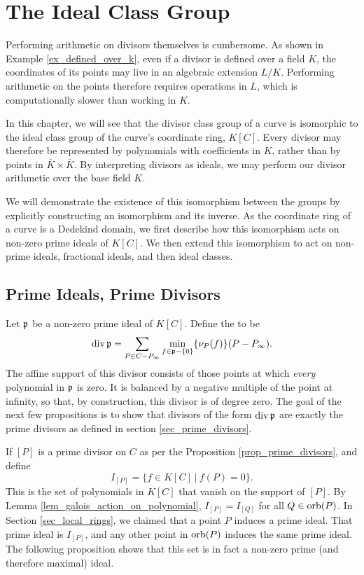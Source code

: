 
\section{The Ideal Class Group}
\label{chap_ideals}

Performing arithmetic on divisors themselves is cumbersome.
As shown in Example \ref{ex_defined_over_k},
even if a divisor is defined over a field $K$,
the coordinates of its points may live in an algebraic extension $L/K$.
Performing arithmetic on the points therefore requires operations in $L$,
which is computationally slower than working in $K$.

In this chapter, we will see that the divisor class group of a curve
is isomorphic to the ideal class group of the curve's coordinate ring, $K[C]$.
Every divisor may therefore be represented by polynomials with coefficients in $K$,
rather than by points in $\bar K \times \bar K$.
By interpreting divisors as ideals,
we may perform our divisor arithmetic over the base field $K$.

We will demonstrate the existence of this isomorphism between the groups
by explicitly constructing an isomorphism and its inverse.
As the coordinate ring of a curve is a Dedekind domain,
we first describe how this isomorphism acts on non-zero prime ideals of $K[C]$.
We then extend this isomorphism to act on non-prime ideals, fractional ideals, and then ideal classes.



\subsection{Prime Ideals, Prime Divisors}

Let $\frak p$ be a non-zero prime ideal of $K[C]$.
Define the  to be
  \[ \div \frak p = \sum_{P \in C - P_\infty} \min_{f \in \frak p - \{0\}}\{\nu_P(f)\}(P - P_\infty). \]
The affine support of this divisor consists of those points at which \emph{every} polynomial in $\frak p$ is zero.
It is balanced by a negative multiple of the point at infinity,
so that, by construction, this divisor is of degree zero.
The goal of the next few propositions is to show that divisors of the form $\div \frak p$
are exactly the prime divisors as defined in section \ref{sec_prime_divisors}.

If $[P]$ is a prime divisor on $C$ as per the Proposition \ref{prop_prime_divisors}, and define
\[ I_{[P]} = \{ f \in K[C] ~|~ f(P) = 0 \}. \]
This is the set of polynomials in $K[C]$ that vanish on the support of $[P]$.
By Lemma \ref{lem_galois_action_on_polynomial}, $I_{[P]} = I_{[Q]}$ for all $Q \in \orb(P)$.
In Section \ref{sec_local_rings}, we claimed that a point $P$ induces a prime ideal.
That prime ideal is $I_{[P]}$, and any other point in $\orb(P)$ induces the same prime ideal.
The following proposition shows that this set is in fact a non-zero prime (and therefore maximal) ideal.

